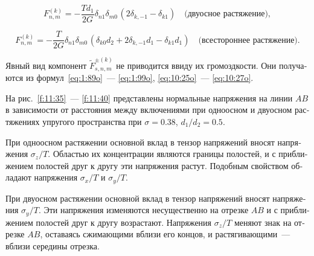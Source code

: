 \begin{russian}
\begin{equation*}
F_{n,m}^{(k)} =  -\frac{Td_1}{2G}{\delta _{n1}}{\delta _{m0\,}}(2{\delta _{k, - 1}} - {\delta _{k1}})\quad\text{(двуосное растяжение)},
\end{equation*}

\begin{equation*}
F_{n,m}^{(k)} =  -\frac{T}{2G}{\delta _{n1}}{\delta _{m0\,}}(\delta_{k0}d_2+2{\delta _{k, - 1}}d_1 - {\delta _{k1}}d_1)\quad\text{(всестороннее растяжение)}.
\end{equation*}

Явный вид компонент $\tilde F_{s,n,m}^{\pm(k)}$ не приводится ввиду их громоздкости. Они получаются из формул~\eqref{eq:1:89o}~--- \eqref{eq:1:99o}, \eqref{eq:10:25o}~--- \eqref{eq:10:27o}.

На рис.~\ref{f:11:35}~--- \ref{f:11:40} представлены нормальные напряжения на линии $AB$ в зависимости от расстояния между включениями при одноосном и двуосном растяжениях упругого пространства при $\sigma=0.38$, $d_1/d_2=0.5$.

При одноосном растяжении основной вклад в тензор напряжений вносят напряжения $\sigma_z/T$. Областью их концентрации являются границы полостей, и с приближением полостей друг к другу эти напряжения растут. Подобным свойством обладают напряжения $\sigma_x/T$ и $\sigma_y/T$.

При двуосном растяжении основной вклад в тензор напряжений вносят напряжения $\sigma_y/T$. Эти напряжения изменяются несущественно на отрезке $AB$ и с приближением полостей друг к другу возрастают. Напряжения $\sigma_z/T$ меняют знак на отрезке $AB$, оставаясь сжимающими вблизи его концов, и растягивающими~--- вблизи середины отрезка.


\end{russian}
